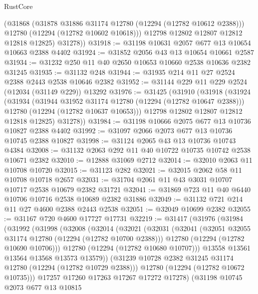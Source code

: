 \begin{lexlean}{RustCore}
\begin{coremodule}
          (@31868
            (@31878 @31886 @31174 @12780 (@12294 (@12782 @10612 @2388)))
            @12780
            (@12294 (@12782 @10602 @10618)))
          @12798
          @12802
          @12807
          @12812
          @12818
          @12825)
        @31278))
@31918 := @31198 @10631 @2057 @677 @13 @10654 @10663 @2388 @4402
@31924 := @31852 @2056 @43 @13 @10654 @10661 @2587
@31934 := @31232 @250 @11 @40 @2650 @10653 @10660 @2538 @10636 @2382 @31245
@31935 := @31132 @248
@31944 := @31935 @214 @11 @27 @2524 @2388 @2443 @2538 @10646 @2382
@31952 := @31144 @229 @11 @229 @2524 (@12034 (@31149 @229)) @13292
@31976 := @31425
    (@31910
      (@31918
        (@31924
          (@31934
            (@31944 @31952 @31174 @12780 (@12294 (@12782 @10647 @2388)))
            @12780
            (@12294 (@12782 @10637 @10653)))
          @12798
          @12802
          @12807
          @12812
          @12818
          @12825)
        @31278))
@31984 := @31198 @10666 @2075 @677 @13 @10736 @10827 @2388 @4402
@31992 := @31097 @2066 @2073 @677 @13 @10736 @10745 @2388 @10827
@31998 := @31124 @2065 @43 @13 @10736 @10743 @4384
@32008 := @31132 @2063 @292 @11 @40 @10722 @10735 @10742 @2538 @10671 @2382
@32010 := @12888 @31069 @2712
@32014 := @32010 @2063 @11 @10708 @10720
@32015 := @31123 @282
@32021 := @32015 @2062 @58 @11 @10708 @10718 @2657
@32031 := @31704 @2061 @11 @43 @3031 @10707 @10717 @2538 @10679 @2382 @31721
@32041 := @31869 @723 @11 @40 @6440 @10706 @10716 @2538 @10689 @2382 @31886
@32049 := @31132 @721 @214 @11 @27 @4600 @2388 @2443 @2538
@32051 := @32049 @10699 @2382
@32055 := @31167 @720 @4600 @17727 @17731
@32219 := @31417
    (@31976
      (@31984
        (@31992
          (@31998
            (@32008
              (@32014
                (@32021
                  (@32031
                    (@32041
                      (@32051 @32055 @31174 @12780 (@12294 (@12782 @10700 @2388)))
                      @12780
                      (@12294 (@12782 @10690 @10706)))
                    @12780
                    (@12294 (@12782 @10680 @10707)))
                  @13558
                  @13561
                  @13564
                  @13568
                  @13573
                  @13579))
              (@31239 @10728 @2382 @31245 @31174 @12780 (@12294 (@12782 @10729 @2388)))
              @12780
              (@12294 (@12782 @10672 @10735)))
            @17257
            @17260
            @17263
            @17267
            @17272
            @17278)
          (@31198
            @10745
            @2073
            @677
            @13
            @10815

\end{coremodule}
\end{lexlean}
